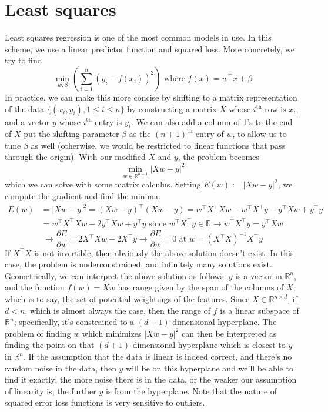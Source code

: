 \documentclass{article}
\begin{document}
\section{Least squares}
Least squares regression is one of the most common models in use. In this scheme, we use a linear predictor function and squared loss. More concretely, we try to find
$$ \min_{w, \beta} \left( \sum_{i = 1}^n (y_i - f(x_i))^2 \right) \text{ where } f(x) = w^\intercal x + \beta $$
In practice, we can make this more concise by shifting to a matrix representation of the data $ \{ (x_i, y_i), 1 \leq i \leq n \} $ by constructing a matrix $ X $ whose $ i^{\text{th}} $ row is $ x_i $, and a vector $ y $ whose $ i^{\text{th}} $ entry is $ y_i $. We can also add a column of 1's to the end of $ X $ put the shifting parameter $ \beta $ as the $ (n + 1)^{\text{th}} $ entry of $ w $, to allow us to tune $ \beta $ as well (otherwise, we would be restricted to linear functions that pass through the origin). With our modified $ X $ and $ y $, the problem becomes
$$ \min_{w \in \mathbb{R}^{n + 1}} |X w - y|^2 $$
which we can solve with some matrix calculus. Setting $ E(w) := | X w - y|^2 $, we compute the gradient and find the minima:
$$ \begin{aligned}
    E(w) &= |X w - y|^2 = (X w - y)^\intercal (X w - y) =  w^\intercal X^\intercal X w - w^\intercal X^\intercal y - y^\intercal X w + y^\intercal y \\
    &= w^\intercal X^\intercal X w - 2 y^\intercal X w + y^\intercal y \text{ since } w^\intercal X^\intercal y \in \mathbb{R} \rightarrow w^\intercal X^\intercal y = y^\intercal X w
\end{aligned} $$
$$ \rightarrow \frac{\partial E}{\partial w} = 2 X^\intercal X w - 2 X^\intercal y \rightarrow \frac{\partial E}{\partial w} = 0 \text{ at } w = (X^\intercal X)^{-1} X^\intercal y $$
If $ X^\intercal X $ is not invertible, then obviously the above solution doesn't exist. In this case, the problem is underconstrained, and infinitely many solutions exist.
\newline
Geometrically, we can interpret the above solution as follows. $ y $ is a vector in $ \mathbb{R}^n $, and the function $ f(w) = X w $ has range given by the span of the columns of $ X $, which is to say, the set of potential weightings of the features. Since $ X \in \mathbb{R}^{n \times d} $, if $ d < n $, which is almost always the case, then the range of $ f $ is a linear subspace of $ \mathbb{R}^n $; specifically, it's constrained to a $ (d + 1) $-dimensional hyperplane. The problem of finding $ w $ which minimizes $ |X w - y|^2 $ can then be interpreted as finding the point on that $ (d + 1) $-dimensional hyperplane which is closest to $ y $ in $ \mathbb{R}^n $. If the assumption that the data is linear is indeed correct, and there's no random noise in the data, then $ y $ will be on this hyperplane and we'll be able to find it exactly; the more noise there is in the data, or the weaker our assumption of linearity is, the further $ y $ is from the hyperplane. Note that the nature of squared error loss functions is very sensitive to outliers.
\end{document}
